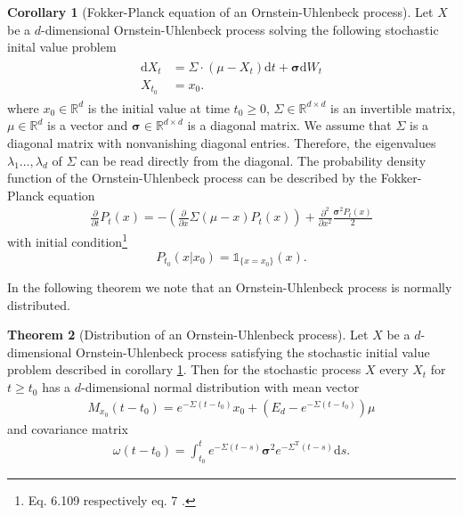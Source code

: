 \documentclass[11pt,titlepage]{article}
\newcommand{\R}{\mathbb{R}} %
\theoremstyle{definition}
\newtheorem{theorem}{Theorem}[section]
\newtheorem{corollary}[theorem]{Corollary}
\theoremstyle{remark}
\begin{document}
	\begin{corollary}[Fokker-Planck equation of an Ornstein-Uhlenbeck process]\label{coroll FP of OUP}
		Let $X$ be a $d$-dimensional Ornstein-Uhlenbeck process solving the following stochastic inital value problem
		\begin{align*}
			\begin{split}
				\mathrm{d}X_t &= \Sigma\cdot (\mu-X_t)\mathrm{d}t +\boldsymbol{\sigma} \mathrm{d}W_t\\
				X_{t_0}&=x_0.
			\end{split}
		\end{align*}
		where $x_0\in\R^d$ is the initial value at time $t_0\geq 0$, $\Sigma\in\R^{d\times d}$ is an invertible matrix, $\mu\in\R^d$ is a vector and $\boldsymbol{\sigma}\in\R^{d\times d}$ is a diagonal matrix. We assume that $\Sigma$ is a diagonal matrix with nonvanishing diagonal entries. 
		Therefore, the eigenvalues $\lambda_1\ldots,\lambda_d$ of $\Sigma$ can be read directly from the diagonal. 
		The probability density function of the Ornstein-Uhlenbeck process can be described by the Fokker-Planck equation
		\begin{align*}
			\frac{\partial}{\partial t}P_t(x) = -\left(\frac{\partial}{\partial x}\Sigma(\mu-x)P_t(x)\right) + \frac{\partial^2}{\partial x^2}\frac{\boldsymbol{\sigma}^2 P_t(x)}{2}
		\end{align*}
		with initial condition\footnote{Eq. 6.109 \cite{Risken1996} respectively eq. 7 \cite{Vatiwutipong2019}.}
		\[P_{t_0}(x\vert x_0)=\mathds{1}_{\{x=x_0\}}(x).\]
	\end{corollary}
	
	In the following theorem we note that an Ornstein-Uhlenbeck process is normally distributed.
	
	\begin{theorem}[Distribution of an Ornstein-Uhlenbeck process]
		Let $X$ be a $d$-dimensional Ornstein-Uhlenbeck process satisfying the stochastic 
		initial value problem described in corollary \ref{coroll FP of OUP}. Then for the stochastic 
		process $X$ every $X_t$ for $t\geq t_0$ has a $d$-dimensional normal distribution with mean vector
		\begin{align}
			M_{x_0}(t-t_0)=e^{-\Sigma (t-t_0)}x_0 +(E_d-e^{-\Sigma (t-t_0)})\mu \label{OUP mean vector}
		\end{align}
		and covariance matrix
		\begin{align}
			\omega(t-t_0) = \int_{t_0}^t e^{-\Sigma (t-s)}\boldsymbol{\sigma}^2 e^{-\Sigma^\text{T}(t-s)}\mathrm{d}s. \label{OUP covariance matrix}
		\end{align}
	\end{theorem}
\end{document}
